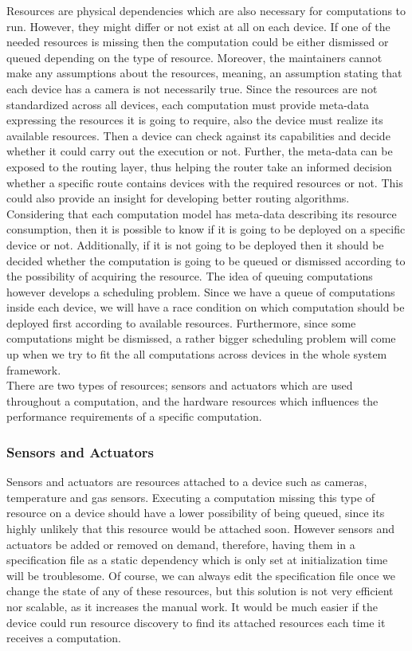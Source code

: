 Resources are physical dependencies which are also necessary for computations to run. However, they might differ or not exist at all on each device. If one of the needed resources is missing then the computation could be either dismissed or queued depending on the type of resource. Moreover, the maintainers cannot make any assumptions about the resources, meaning, an assumption stating that each device has a camera is not necessarily true. Since the resources are not standardized across all devices, each computation must provide meta-data expressing the resources it is going to require, also the device must realize its available resources. Then a device can check against its capabilities and decide whether it could carry out the execution or not. Further, the meta-data can be exposed to the routing layer, thus helping the router take an informed decision whether a specific route contains devices with the required resources or not. This could also provide an insight for developing better routing algorithms.\\

 \noindent Considering that each computation model has meta-data describing its resource consumption, then it is possible to know if it is going to be deployed on a specific device or not. Additionally, if it is not going to be deployed then it should be decided whether the computation is going to be queued or dismissed according to the possibility of acquiring the resource. The idea of queuing computations however develops a scheduling problem. Since we have a queue of computations inside each device, we will have a race condition on which computation should be deployed first according to available resources. Furthermore, since some computations might be dismissed, a rather bigger scheduling problem will come up when we try to fit the all computations across devices in the whole system framework.\\

  \noindent There are two types of resources; sensors and actuators which are used throughout a computation, and the hardware resources which influences the performance requirements of a specific computation.


\subsubsection{Sensors and Actuators}

  Sensors and actuators are resources attached to a device such as cameras, temperature and gas sensors. Executing a computation missing this type of resource on a device should have a lower possibility of being queued, since its highly unlikely that this resource would be attached soon. However sensors and actuators be added or removed on demand, therefore, having them in a specification file as a static dependency which is only set at initialization time will be troublesome. Of course, we can always edit the specification file once we change the state of any of these resources, but this solution is not very efficient nor scalable, as it increases the manual work. It would be much easier if the device could run resource discovery to find its attached resources each time it receives a computation. \\
  
